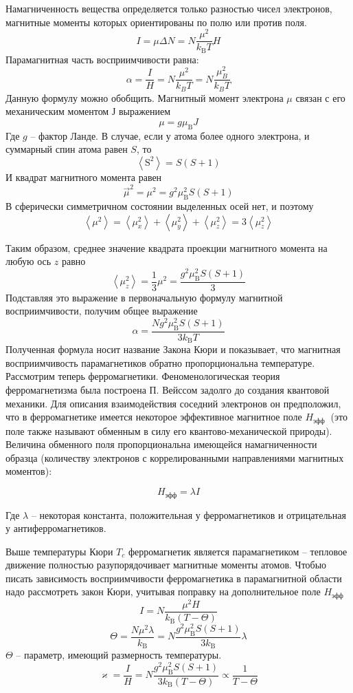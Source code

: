 \documentclass[a4paper, 12pt]{article}%
\begin{document}
Намагниченность вещества определяется только разностью чисел электронов,
магнитные моменты которых ориентированы по полю или против поля.
$$
I=\mu \Delta N=N \frac{\mu^{2}}{k_{\mathrm{B}} T} H
$$
Парамагнитная часть восприимчивости равна:
$$\alpha = \frac{I}{H} = N \frac{\mu^2}{k_B T} = N \frac{\mu_B^2}{k_B T}$$
Данную формулу можно обобщить. Магнитный момент электрона $\mu$ связан с его
механическим моментом $Ј$ выражением
$$
\mu=g \mu_{\mathrm{B}} J
$$
Где $g$ -- фактор Ланде. 
В случае, если у атома более одного электрона, и суммарный спин атома равен $S$, то
$$
\left\langle\mathrm{S}^{2}\right\rangle=S(S+1)
$$
И квадрат магнитного момента равен
$$
\vec{\mu}^{2}=\mu^{2}=g^{2} \mu_{\mathrm{B}}^{2} S(S+1)
$$
В сферически симметричном состоянии выделенных осей нет, и поэтому
$$
\left\langle\mu^{2}\right\rangle=\left\langle\mu_{x}^{2}\right\rangle+\left\langle\mu_{y}^{2}\right\rangle+\left\langle\mu_{z}^{2}\right\rangle=3\left\langle\mu_{z}^{2}\right\rangle
$$

Таким образом, среднее значение квадрата проекции магнитного момента на любую
ось $z$ равно
$$
\left\langle\mu_{z}^{2}\right\rangle=\frac{1}{3} \mu^{2}=\frac{g^{2} \mu_{\mathrm{B}}^{2} S(S+1)}{3}
$$
Подставляя это выражение в первоначальную формулу магнитной восприимчивости, получим общее выражение
$$
\alpha=\frac{N g^{2} \mu_{\mathrm{B}}^{2} S(S+1)}{3 k_{\mathrm{B}} T}
$$
Полученная формула носит название Закона Кюри и показывает, что магнитная
восприимчивость парамагнетиков обратно пропорциональна температуре.
Рассмотрим теперь ферромагнетики. Феноменологическая теория ферромагнетизма
была построена П. Вейссом задолго до создания квантовой механики. Для описания
взаимодействия соседний электронов он предположил, что в ферромагнетике
имеется некоторое эффективное магнитное поле $H_{\text {эфф }}$ (это поле также называют обменным в силу его квантово-механической природы). Величина обменного поля пропорциональна имеющейся намагниченности образца (количеству электронов с
коррелированными направлениями магнитных моментов):

$$
H_{\text{эфф}} = \lambda I
$$

Где $\lambda$ -- некоторая константа, положительная у ферромагнетиков и отрицательная у антиферромагнетиков.

Выше температуры Кюри $T_c$ ферромагнетик является парамагнетиком -- тепловое
движение полностью разупорядочивает магнитные моменты атомов. Чтобыо писать зависимость восприимчивости ферромагнетика в парамагнитной области надо рассмотреть закон Кюри, учитывая поправку на дополнительное поле $H_{\text {эфф }}$
$$
I=N \frac{\mu^{2} H}{k_{\mathrm{B}}(T-\Theta)} 
$$
$$
\Theta=\frac{N \mu^{2} \lambda}{k_{\mathrm{B}}}=N \frac{g^{2} \mu_{\mathrm{B}}^{2} S(S+1)}{3 k_{\mathrm{B}}} \lambda
$$
$\Theta$ -- параметр, имеющий размерность температуры.
$$
\varkappa=\frac{I}{H}=N \frac{g^{2} \mu_{\mathrm{B}}^{2} S(S+1)}{3 k_{\mathrm{B}}(T-\Theta)} \propto \frac{1}{T-\Theta}
$$
\end{document}
